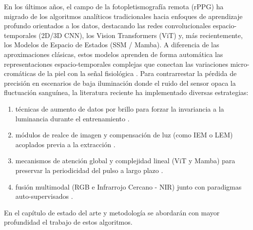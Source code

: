 \begin{itemize}
    En los últimos años, el campo de la fotopletismografía remota (rPPG) ha migrado de los algoritmos analíticos tradicionales hacia enfoques de aprendizaje 
    profundo orientados a los datos, destacando las redes convolucionales espacio-temporales (2D/3D CNN), los Vision Transformers (ViT) y, más recientemente, 
    los Modelos de Espacio de Estados (SSM / Mamba). A diferencia de las aproximaciones clásicas, estos modelos aprenden de forma automática las 
    representaciones espacio-temporales complejas que conectan las variaciones micro-cromáticas de la piel con la señal fisiológica \cite{debnath2026advanced_signal, chen2024image_en, yang2022assessment_dl}. Para 
    contrarrestar la pérdida de precisión en escenarios de baja iluminación donde el ruido del sensor opaca la fluctuación sanguínea, la literatura 
    reciente ha implementado diversas estrategias: 
    
    \begin{enumerate}
        \item técnicas de aumento de datos por brillo para forzar la invariancia a la luminancia durante el entrenamiento \cite{debnath2026advanced_signal}.
        \item módulos de realce de imagen y compensación de luz (como IEM o LEM) acoplados previa a la extracción \cite{yang2022assessment_dl, kim2022study}.
        \item mecanismos de atención global y complejidad lineal (ViT y Mamba) para preservar la periodicidad del pulso a largo plazo \cite{yang2022assessment_dl, chen2024image_en}.
        \item fusión multimodal (RGB e Infrarrojo Cercano - NIR) junto con paradigmas auto-supervisados \cite{yang2022assessment_dl, speth2023hallucinated}.
    \end{enumerate}

    En el capítulo de estado del arte y metodología se abordarán con mayor profundidad el trabajo de estos algoritmos.




\end{itemize}
